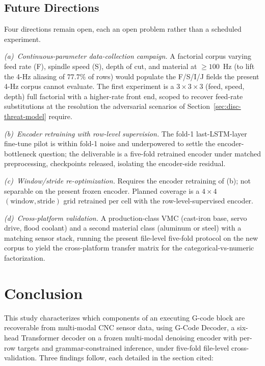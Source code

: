 \documentclass[sensors,article,submit,moreauthors,pdftex]{Definitions/mdpi}
\newcommand{\modelname}{G-Code Decoder}
\begin{document}
\subsection{Future Directions}
\label{sec:roadmap}

Four directions remain open, each an open problem rather than a scheduled experiment.

\emph{(a)~Continuous-parameter data-collection campaign.} A factorial corpus varying feed rate (F), spindle speed (S), depth of cut, and material at $\geq\!100$~Hz (to lift the 4-Hz aliasing of $77.7\%$ of rows) would populate the F/S/I/J fields the present 4-Hz corpus cannot evaluate. The first experiment is a $3\!\times\!3\!\times\!3$ (feed, speed, depth) full factorial with a higher-rate front end, scoped to recover feed-rate substitutions at the resolution the adversarial scenarios of Section~\ref{sec:disc-threat-model} require.

\emph{(b)~Encoder retraining with row-level supervision.} The fold-1 last-LSTM-layer fine-tune pilot is within fold-1 noise and underpowered to settle the encoder-bottleneck question; the deliverable is a five-fold retrained encoder under matched preprocessing, checkpoints released, isolating the encoder-side residual.

\emph{(c)~Window/stride re-optimization.} Requires the encoder retraining of (b); not separable on the present frozen encoder. Planned coverage is a $4\!\times\!4$ $(\text{window}, \text{stride})$ grid retrained per cell with the row-level-supervised encoder.

\emph{(d)~Cross-platform validation.} A production-class VMC (cast-iron base, servo drive, flood coolant) and a second material class (aluminum or steel) with a matching sensor stack, running the present file-level five-fold protocol on the new corpus to yield the cross-platform transfer matrix for the categorical-vs-numeric factorization.

\section{Conclusion}
\label{sec:conclusion}

This study characterizes which components of an executing G-code block are recoverable from multi-modal CNC sensor data, using \modelname{}, a six-head Transformer decoder on a frozen multi-modal denoising encoder with per-row targets and grammar-constrained inference, under five-fold file-level cross-validation. Three findings follow, each detailed in the section cited:
\end{document}
